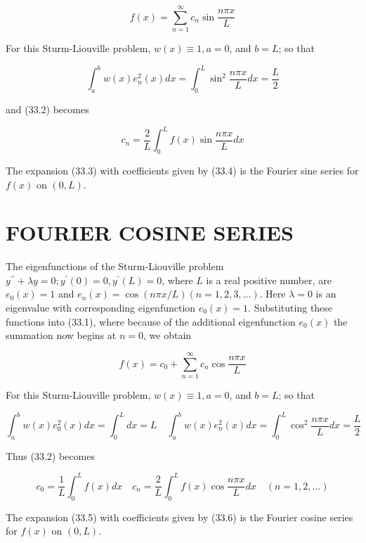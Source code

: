 \documentclass[10pt]{article}
\begin{document}
\begin{equation*}
f(x)=\sum_{n=1}^{\infty} c_{n} \sin \frac{n \pi x}{L} \tag{33.3}
\end{equation*}


For this Sturm-Liouville problem, $w(x) \equiv 1, a=0$, and $b=L$; so that

$$
\int_{a}^{b} w(x) e_{n}^{2}(x) d x=\int_{0}^{L} \sin ^{2} \frac{n \pi x}{L} d x=\frac{L}{2}
$$

and (33.2) becomes


\begin{equation*}
c_{n}=\frac{2}{L} \int_{0}^{L} f(x) \sin \frac{n \pi x}{L} d x \tag{33.4}
\end{equation*}


The expansion (33.3) with coefficients given by (33.4) is the Fourier sine series for $f(x)$ on $(0, L)$.

\section*{FOURIER COSINE SERIES}
The eigenfunctions of the Sturm-Liouville problem $y^{\prime \prime}+\lambda y=0 ; y^{\prime}(0)=0, y^{\prime}(L)=0$, where $L$ is a real positive number, are $e_{0}(x)=1$ and $e_{n}(x)=\cos (n \pi x / L)(n=1,2,3, \ldots)$. Here $\lambda=0$ is an eigenvalue with corresponding eigenfunction $e_{0}(x)=1$. Substituting these functions into (33.1), where because of the additional eigenfunction $e_{0}(x)$ the summation now begins at $n=0$, we obtain


\begin{equation*}
f(x)=c_{0}+\sum_{n=1}^{\infty} c_{n} \cos \frac{n \pi x}{L} \tag{33.5}
\end{equation*}


For this Sturm-Liouville problem, $w(x) \equiv 1, a=0$, and $b=L$; so that

$$
\int_{a}^{b} w(x) e_{0}^{2}(x) d x=\int_{0}^{L} d x=L \quad \int_{a}^{b} w(x) e_{n}^{2}(x) d x=\int_{0}^{L} \cos ^{2} \frac{n \pi x}{L} d x=\frac{L}{2}
$$

Thus (33.2) becomes


\begin{equation*}
c_{0}=\frac{1}{L} \int_{0}^{L} f(x) d x \quad c_{n}=\frac{2}{L} \int_{0}^{L} f(x) \cos \frac{n \pi x}{L} d x \quad(n=1,2, \ldots) \tag{33.6}
\end{equation*}


The expansion (33.5) with coefficients given by (33.6) is the Fourier cosine series for $f(x)$ on $(0, L)$.
\end{document}
